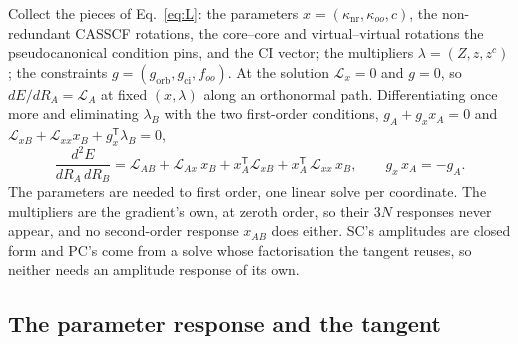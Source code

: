 \documentclass[11pt]{article}
\newcommand{\Lag}{\mathcal L}
\newcommand{\T}{\mathsf T}
\begin{document}
Collect the pieces of Eq.~\eqref{eq:L}: the parameters
$x = (\kappa_{\mathrm{nr}}, \kappa_{oo}, c)$, the non-redundant CASSCF
rotations, the core--core and virtual--virtual rotations the
pseudocanonical condition pins, and the CI vector; the multipliers
$\lambda = (Z, z, z^c)$; the constraints
$g = (g_{\mathrm{orb}}, g_{\mathrm{ci}}, f_{oo})$. At the solution
$\Lag_x = 0$ and $g = 0$, so $dE/dR_A = \Lag_A$ at fixed $(x, \lambda)$
along an orthonormal path. Differentiating once more and eliminating
$\lambda_B$ with the two first-order conditions, $g_A + g_x x_A = 0$ and
$\Lag_{xB} + \Lag_{xx}x_B + g_x^\T\lambda_B = 0$,
\begin{equation}
  \frac{d^2E}{dR_A\,dR_B} = \Lag_{AB} + \Lag_{Ax}\,x_B + x_A^\T\Lag_{xB}
    + x_A^\T\,\Lag_{xx}\,x_B,
  \qquad g_x\,x_A = -g_A.
  \label{eq:hess}
\end{equation}
The parameters are needed to first order, one linear solve per coordinate.
The multipliers are the gradient's own, at zeroth order, so their $3N$
responses never appear, and no second-order response $x_{AB}$ does either.
SC's amplitudes are closed form and PC's come from a solve whose
factorisation the tangent reuses, so neither needs an amplitude response of
its own.

\subsection{The parameter response and the tangent}
\label{sec:hess-response}
\end{document}
